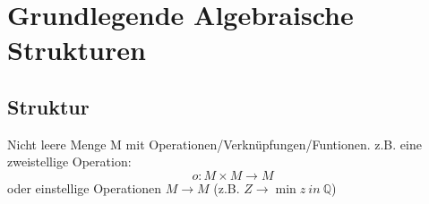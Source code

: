 \documentclass{article}
\begin{document}
  \section{Grundlegende Algebraische Strukturen}
    \subsection{Struktur}
      Nicht leere Menge M mit Operationen/Verknüpfungen/Funtionen. z.B. eine zweistellige Operation:
      \begin{equation}
        o: M \times M \rightarrow M
      \end{equation}
      oder einstellige Operationen $M \rightarrow M$ (z.B. $Z \rightarrow \min z\ in\ \mathbb{Q}$)
\end{document}
